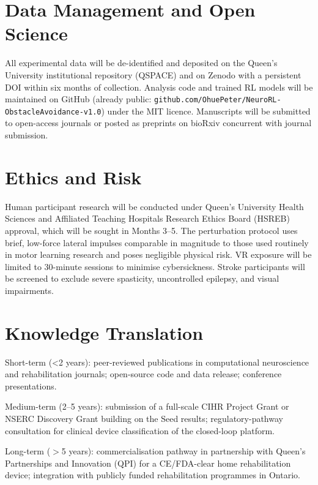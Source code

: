 \documentclass[12pt]{article}
\begin{document}
\section{Data Management and Open Science}

All experimental data will be de-identified and deposited on the Queen's
University institutional repository (QSPACE) and on Zenodo with a
persistent DOI within six months of collection.
Analysis code and trained RL models will be maintained on GitHub
(already public: \texttt{github.com/OhuePeter/NeuroRL-ObstacleAvoidance-v1.0})
under the MIT licence.
Manuscripts will be submitted to open-access journals or posted as
preprints on bioRxiv concurrent with journal submission.

\section{Ethics and Risk}

Human participant research will be conducted under Queen's University
Health Sciences and Affiliated Teaching Hospitals Research Ethics Board
(HSREB) approval, which will be sought in Months 3--5.
The perturbation protocol uses brief, low-force lateral impulses comparable
in magnitude to those used routinely in motor learning research and poses
negligible physical risk.
VR exposure will be limited to 30-minute sessions to minimise cybersickness.
Stroke participants will be screened to exclude severe spasticity, uncontrolled
epilepsy, and visual impairments.

\section{Knowledge Translation}

Short-term (\textless 2 years): peer-reviewed publications in computational
neuroscience and rehabilitation journals; open-source code and data release;
conference presentations.

Medium-term (2--5 years): submission of a full-scale CIHR Project Grant or
NSERC Discovery Grant building on the Seed results; regulatory-pathway
consultation for clinical device classification of the closed-loop platform.

Long-term ($>$5 years): commercialisation pathway in partnership with
Queen's Partnerships and Innovation (QPI) for a CE/FDA-clear home
rehabilitation device; integration with publicly funded rehabilitation
programmes in Ontario.



\end{document}
